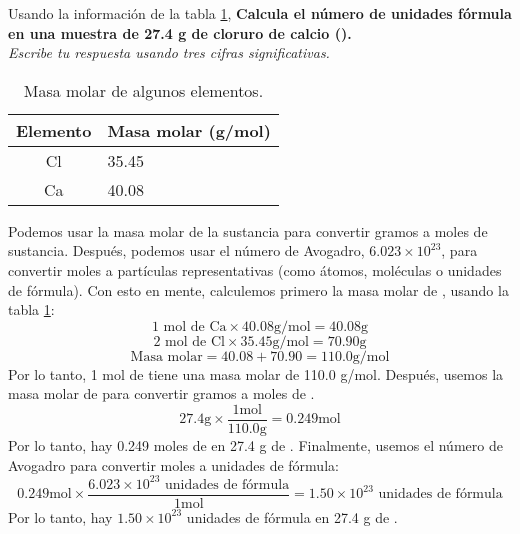\begin{multicols}{2}
    Usando la información de la tabla \ref{tab:q005},
\textbf{Calcula el número de unidades fórmula en una muestra de 27.4 g de cloruro de calcio ().}\\
\emph{Escribe tu respuesta usando tres cifras significativas.}

    \begin{table}[H]
        \centering
        \caption{Masa molar de algunos elementos.}
        \label{tab:q005}
        \begin{tabular}{c|p{2.2cm}}
            \textbf{Elemento} & \textbf{Masa molar (g/mol)} \\\midrule
            Cl                & 35.45                       \\\hline
            Ca                & 40.08                       \\\hline
            \bottomrule
        \end{tabular}
    \end{table}

\end{multicols}

\begin{solutionbox}{10cm}
    Podemos usar la masa molar de la sustancia para convertir gramos a moles de sustancia. Después, podemos usar el número de Avogadro, $6.023 \times 10^{23}$, para convertir moles a partículas representativas (como átomos, moléculas o unidades de fórmula). Con esto en mente, calculemos primero la masa molar de , usando la tabla \ref{tab:q005}:
    \[1 \text{ mol de Ca} \times 40.08 \text{g/mol} = 40.08 \text{g}\]
    \[2 \text{ mol de Cl} \times 35.45 \text{g/mol} = 70.90 \text{g}\]
    \[\text{Masa molar} = 40.08 + 70.90 = 110.0 \text{g/mol}\]
    Por lo tanto, 1 mol de  tiene una masa molar de 110.0 g/mol.
    Después, usemos la masa molar de  para convertir gramos a moles de .
\[27.4 \text{g} \times \frac{1 \text{mol}}{110.0 \text{g}} = 0.249 \text{mol}\]
    Por lo tanto, hay 0.249 moles de  en 27.4 g de .
    Finalmente, usemos el número de Avogadro para convertir moles a unidades de fórmula:
    \[0.249 \text{mol} \times \frac{6.023 \times 10^{23} \text{ unidades de fórmula}}{1 \text{mol}} = 1.50 \times 10^{23} \text{ unidades de fórmula}\]
    Por lo tanto, hay $1.50 \times 10^{23}$ unidades de fórmula en 27.4 g de .
\end{solutionbox}